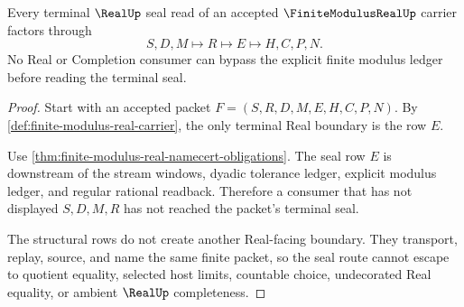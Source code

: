 \begin{theorem}
\label{thm:finite-modulus-real-real-seal-nonescape}
Every terminal $\RealUp$ seal read of an accepted $\FiniteModulusRealUp$ carrier factors through
$$
S,D,M \longmapsto R \longmapsto E \longmapsto H,C,P,N .
$$
No Real or Completion consumer can bypass the explicit finite modulus ledger before reading the terminal seal.
\end{theorem}
\begin{proof}
Start with an accepted packet $F=(S,R,D,M,E,H,C,P,N)$. By \autoref{def:finite-modulus-real-carrier}, the only terminal Real boundary is the row $E$.

Use \autoref{thm:finite-modulus-real-namecert-obligations}. The seal row $E$ is downstream of the stream windows, dyadic tolerance ledger, explicit modulus ledger, and regular rational readback. Therefore a consumer that has not displayed $S,D,M,R$ has not reached the packet's terminal seal.

The structural rows do not create another Real-facing boundary. They transport, replay, source, and name the same finite packet, so the seal route cannot escape to quotient equality, selected host limits, countable choice, undecorated Real equality, or ambient $\RealUp$ completeness.
\end{proof}




